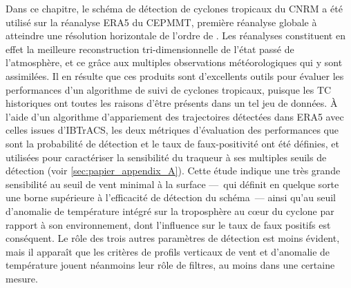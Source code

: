 \documentclass[../main.tex]{subfiles}
\begin{document}
Dans ce chapitre, le schéma de détection de cyclones tropicaux du CNRM a été utilisé sur la réanalyse ERA5 du CEPMMT, première réanalyse globale à atteindre une
résolution horizontale de l'ordre de . Les réanalyses constituent en effet la meilleure reconstruction tri-dimensionnelle de l'état passé de
l'atmosphère, et ce grâce aux multiples observations météorologiques qui y sont assimilées. Il en résulte que ces produits sont d'excellents outils pour évaluer
les performances d'un algorithme de suivi de cyclones tropicaux, puisque les TC historiques ont toutes les raisons d'être présents dans un tel jeu de données. À
l'aide d'un algorithme d'appariement des trajectoires détectées dans ERA5 avec celles issues d'IBTrACS, les deux métriques d'évaluation des performances que
sont la probabilité de détection et le taux de faux-positivité ont été définies, et utilisées pour caractériser la sensibilité du traqueur à ses multiples
seuils de détection (voir \cref{sec:papier_appendix_A}). Cette étude indique une très grande sensibilité au seuil de vent minimal à la surface ---~qui définit
en quelque sorte une borne supérieure à l'efficacité de détection du schéma~--- ainsi qu'au seuil d'anomalie de température intégré sur la troposphère au cœur
du cyclone par rapport à son environnement, dont l'influence sur le taux de faux positifs est conséquent. Le rôle des trois autres paramètres de détection est
moins évident, mais il apparaît que les critères de profils verticaux de vent et d'anomalie de température jouent néanmoins leur rôle de filtres, au moins dans
une certaine mesure.
\end{document}
